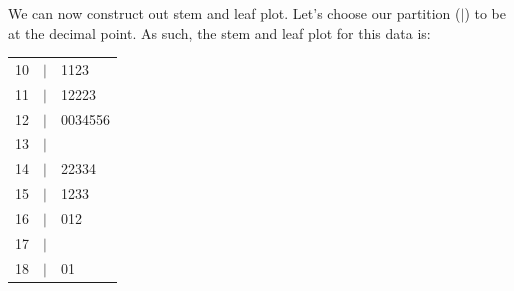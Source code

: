 \begin{example}
\noindent
We can now construct out stem and leaf plot. 
Let's choose our partition ($|$) to be at the decimal point.
As such, the stem and leaf plot for this data is:\\

\vspace*{-0.50em}

\begin{center}
\begin{tabular}{r c l}
10	&	$|$	&	1123		\\
11	&	$|$	&	12223	\\
12	&	$|$	&	0034556	\\
13	&	$|$	&			\\
14	&	$|$	&	22334	\\
15	&	$|$	&	1233		\\
16	&	$|$	&	012		\\
17	&	$|$	&			\\
18	&	$|$	&	01
\end{tabular}
\end{center}
\end{example}